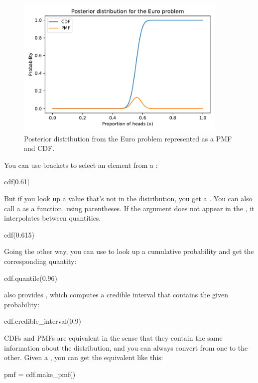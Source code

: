 \documentclass[12pt]{book}
\theoremstyle{exercise}
\begin{document}
\begin{figure}
\centerline{\includegraphics[width=4in]{figs/fig06-01.pdf}}
\caption{Posterior distribution from the Euro problem represented as a PMF and CDF.}
\label{fig06-01}
\end{figure}

You can use brackets to select an element from a :

\begin{code}
cdf[0.61]
\end{code}

But if you look up a value that's not in the distribution, you get a .
You can also call a  as a function, using parentheses.
If the argument does not appear in the , it interpolates between quantities.

\begin{code}
cdf(0.615)
\end{code}

Going the other way, you can use  to look up a cumulative probability and get the corresponding quantity:

\begin{code}
cdf.quantile(0.96)
\end{code}

 also provides , which computes a credible interval that contains the given probability:

\begin{code}
cdf.credible_interval(0.9)
\end{code}

CDFs and PMFs are equivalent in the sense that they contain the
same information about the distribution, and you can always convert
from one to the other.
Given a , you can get the equivalent  like this:

\begin{code}
pmf = cdf.make_pmf()
\end{code}
\end{document}
